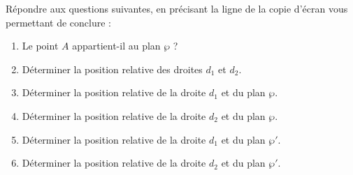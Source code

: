 \documentclass{cornouaille}
\begin{document}
\begin{TP}




Répondre aux questions suivantes, en
précisant la ligne de la copie d'écran vous permettant de conclure :
\begin{enumerate}
\item Le point $A$ appartient-il au plan $\wp$ ?
\item Déterminer la position relative des droites $d_1$ et $d_2$.
\item Déterminer la position relative de la droite $d_1$ et du plan
  $\wp$.
\item Déterminer la position relative de la droite $d_2$ et du plan
  $\wp$.
\item Déterminer la position relative de la droite $d_1$ et du plan
  $\wp'$.
\item Déterminer la position relative de la droite $d_2$ et du plan
  $\wp'$.
\end{enumerate}
\end{TP}
\end{document}
